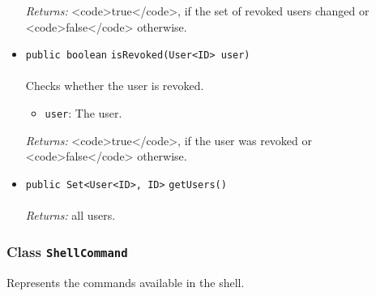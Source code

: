 \begin{itemize}
\emph{Returns:} <code>true</code>, if the set of revoked users changed or <code>false</code> otherwise.

\item \lstinline|public boolean| \lstinline|isRevoked|\lstinline|(User<ID> user)|\\ \\[-0.6em]
Checks whether the user is revoked.
\begin{itemize}
\item \lstinline|user|: The user.
\end{itemize}

\emph{Returns:} <code>true</code>, if the user was revoked or <code>false</code> otherwise.

\item \lstinline|public Set<User<ID>, ID>| \lstinline|getUsers|\lstinline|()|\\ \\[-0.6em]
\emph{Returns:} all users.



\end{itemize}

\subsubsection{Class \lstinline|ShellCommand|}
Represents the commands available in the shell. \\
\noindent\begin{minipage}[t]{5cm}
\vspace{0.3em}
\hspace*{2em}
\vspace{0.3em}
\end{minipage}




